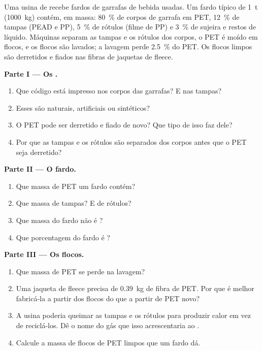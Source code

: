 \begin{problem}
\label{pb:g8:plastics:1}
Uma usina de  recebe fardos de garrafas de bebida usadas. Um
fardo típico de \qty{1}{t} (\qty{1000}{kg}) contém, em massa:
\qty{80}{\percent} de corpos de garrafa em PET, \qty{12}{\percent} de
tampas (PEAD e PP), \qty{5}{\percent} de rótulos (filme de PP) e
\qty{3}{\percent} de sujeira e restos de líquido. Máquinas separam as
tampas e os rótulos dos corpos, o PET é moído em flocos, e os flocos
são lavados; a lavagem perde \qty{2.5}{\percent} do PET. Os flocos limpos
são derretidos e fiados nas fibras de jaquetas de fleece.

\medskip
\noindent\textbf{Parte I --- Os .}
\begin{enumerate}
  \item Que código está impresso nos corpos das garrafas? E nas tampas?
  \item Esses  são naturais, artificiais ou sintéticos?
  \item O PET pode ser derretido e fiado de novo? Que tipo de 
        isso faz dele?
  \item Por que as tampas e os rótulos são separados dos corpos antes que
        o PET seja derretido?
\end{enumerate}

\medskip
\noindent\textbf{Parte II --- O fardo.}
\begin{enumerate}[resume]
  \item Que massa de PET um fardo contém?
  \item Que massa de tampas? E de rótulos?
  \item Que massa do fardo não é ?
  \item Que porcentagem do fardo é ?
\end{enumerate}

\medskip
\noindent\textbf{Parte III --- Os flocos.}
\begin{enumerate}[resume]
  \item Que massa de PET se perde na lavagem?
  \item Uma jaqueta de fleece precisa de \qty{0.39}{kg} de fibra de PET.
        Por que é melhor fabricá-la a partir dos flocos do que a partir
        de PET novo?
  \item A usina poderia queimar as tampas e os rótulos para produzir
        calor em vez de reciclá-los. Dê o nome do gás que isso
        acrescentaria ao .
  \item Calcule a massa de flocos de PET limpos que um fardo dá.
\end{enumerate}
\end{problem}
